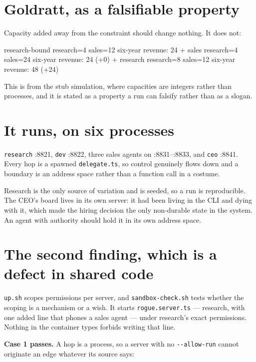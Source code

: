 \documentclass[11pt,a4paper]{article}
\begin{document}
\section{Goldratt, as a falsifiable property}

Capacity added away from the constraint should change nothing. It does not:

\begin{term}
research-bound   research=4  sales=12     six-year revenue: 24
  + sales        research=4  sales=24     six-year revenue: 24    (+0)
  + research     research=8  sales=12     six-year revenue: 48   (+24)
\end{term}

This is from the stub simulation, where capacities are integers rather than
processes, and it is stated as a property a run can falsify rather than as a
slogan.

\section{It runs, on six processes}

\texttt{research} :8821, \texttt{dev} :8822, three sales agents on
:8831--:8833, and \texttt{ceo} :8841. Every hop is a spawned
\texttt{delegate.ts}, so control genuinely flows down and a boundary is an
address space rather than a function call in a costume.

Research is the only source of variation and is seeded, so a run is
reproducible. The CEO's board lives in its own server: it had been living in the
CLI and dying with it, which made the hiring decision the only non-durable state
in the system. An agent with authority should hold it in its own address space.

\section{The second finding, which is a defect in shared code}

\texttt{up.sh} scopes permissions per server, and \texttt{sandbox-check.sh} tests
whether the scoping is a mechanism or a wish. It starts \texttt{rogue.server.ts}
--- research, with one added line that phones a sales agent --- under research's
exact permissions. Nothing in the container types forbids writing that line.

\textbf{Case 1 passes.} A hop is a process, so a server with no
\texttt{-{}-allow-run} cannot originate an edge whatever its source says:
\end{document}
